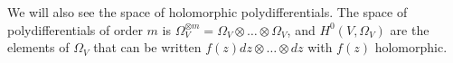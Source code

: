 \documentclass[draft, 11pt, notitlepage]{article} %
\theoremstyle{plain}
\theoremstyle{remark}
\begin{document}
We will also see the space of holomorphic polydifferentials.
The space of polydifferentials of order $m$ is $\Omega_V^{\otimes m} = \Omega_V \otimes \ldots \otimes \Omega_V$, and $H^0(V,\Omega_V)$ are the elements of $\Omega_V$ that can be written $f(z)dz\otimes \ldots \otimes dz$ with $f(z)$ holomorphic.
\begin{comment}
To do this we use the notion of a differential form on a Riemann surface. 
A differential form gives, at each point $P$ on our Riemann surface, a linear function from the tangent space at $P$ to $\mathbb C$.
We call the function at this point $df_P$, and the differential form itself is denoted just $df$.
So a differential form is a function that, at each point, gives another function on the tangent space.
Of course, the tangent space depends on the co-ordinate chart chosen, but 

In order to relate this to algebraic geometry we first need to introduce some of the key components of the topic.
Firstly, the object of study is the variety.
A variety $V = V(f_1, \ldots, f_n)$ is the zero set of some polynomaials $f_1, \ldots , f_n$, with coefficients in the field $k$ we are working over.
Curves are one dimensional varieties, where dimension 


As already stated, there is an equivalence between smooth complex curves and Riemann surfaces.
As such there is an algebraic definition of differentials on a complex curve, and this naturally extends to any curve over an algebraically closed field.
We denote the space of holomorphic differentials on a curve $X$ over an algebraically closed field $k$ by $H^0(X,\Omega_X)$.
Inspired by the aforementioned equivlance, we call the dimension $\dim_kH^0(X,\Omega_X)$ the genus of $X$.



\begin{comment}
The equivalence between Riemann Surfaces and smooth curves over the complex numbers
is crystallised by the Riemann-Roch theorem, which relates the topological genus of Riemann surfaces to the arithmetic genus of complex curves. 
This can in fact be used to define the genus of a curves.
But this theorem holds in precisely the same form for curves over any algebraically closed field, and so provides a natural way to extend the notion of genus to any curve in this case.

So how do we define the genus of a curve over $\mathbb C$ (note that we could replace $\mathbb C$ by any algebraically closed field; we use $\mathbb C$ for now for the sake of concreteness).
We first must make precise what we mean by a curve over $\mathbb C$.
Given complex polynomials $f_1(x_1,\ldots , x_m), \ldots ,f_n(x_1,\ldots, x_m)$ we let $ V := V(f_1,\ldots , f_n)$ denote the set of points in $(a_1, \ldots , a_m) \in \mathbb C^m$ that are solutions to $f_1,\ldots, f_n$.
This is a curve if it is dimension one (one way of defining dimension is the maximum dimension of the tangent space at a point where not all the derivatives vanish).


\end{comment}
\end{document}
